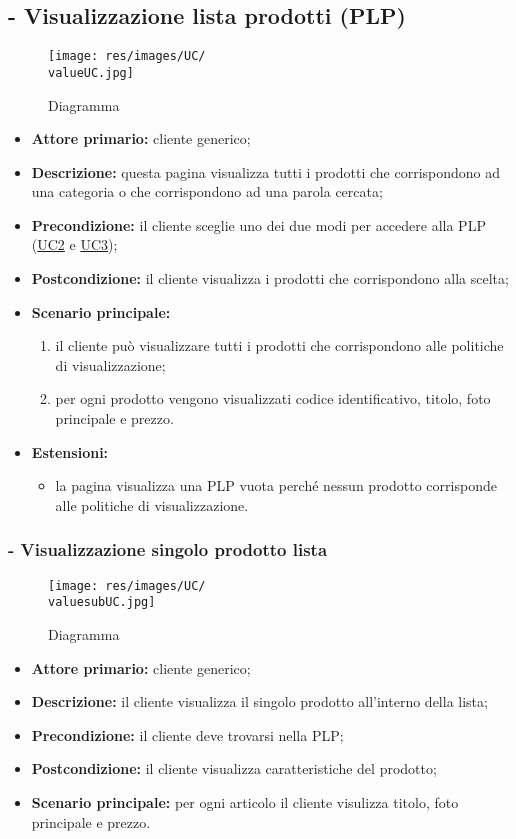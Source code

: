 \subsection{ - Visualizzazione lista prodotti (PLP)}
\begin{figure}[H]
    \centering
    \texttt{[image: res/images/UC/\\valueUC.jpg]}
    \caption{Diagramma }
\end{figure}
\begin{itemize}
    \item \textbf{Attore primario:} cliente generico;
    \item \textbf{Descrizione:} questa pagina visualizza tutti i prodotti che corrispondono ad una categoria o che corrispondono ad una parola cercata;
    \item \textbf{Precondizione:} il cliente sceglie uno dei due modi per accedere alla PLP (\hyperref[UC2]{UC2} e \hyperref[UC3]{UC3});
    \item \textbf{Postcondizione:} il cliente visualizza i prodotti che corrispondono alla scelta;
    \item \textbf{Scenario principale:}
          \begin{enumerate}
              \item il cliente può visualizzare tutti i prodotti che corrispondono alle politiche di visualizzazione;
              \item per ogni prodotto vengono visualizzati codice identificativo, titolo, foto principale e prezzo.
          \end{enumerate}
    \item \textbf{Estensioni:}
          \begin{itemize}
              \item la pagina visualizza una PLP vuota perché nessun prodotto corrisponde alle politiche di visualizzazione.
          \end{itemize}
\end{itemize}

\stepsubUserCase
\subsubsection{ - Visualizzazione singolo prodotto lista}
\begin{figure}[H]
    \centering
    \texttt{[image: res/images/UC/\\valuesubUC.jpg]}
    \caption{Diagramma }
\end{figure}
\begin{itemize}
    \item \textbf{Attore primario:} cliente generico;
    \item \textbf{Descrizione:} il cliente visualizza il singolo prodotto all'interno della lista;
    \item \textbf{Precondizione:} il cliente deve trovarsi nella PLP;
    \item \textbf{Postcondizione:} il cliente visualizza caratteristiche del prodotto;
    \item \textbf{Scenario principale:} per ogni articolo il cliente visulizza titolo, foto principale e prezzo.
\end{itemize}


